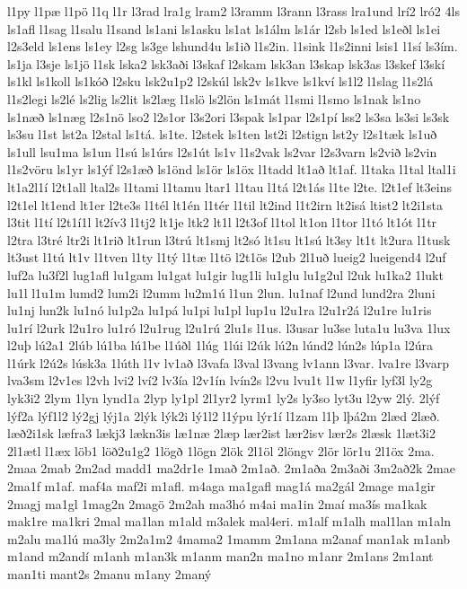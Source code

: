 {l1py
l1pæ
l1pö
l1q
l1r
l3rad
lra1g
lram2
l3ramm
l3rann
l3rass
lra1und
lrí2
lró2
4ls
ls1afl
l1sag
l1salu
l1sand
ls1ani
ls1asku
ls1at
ls1álm
ls1ár
l2sb
ls1ed
ls1eðl
ls1ei
l2s3eld
ls1ens
ls1ey
l2sg
ls3ge
lshund4u
ls1ið
l1s2in.
l1sink
l1s2inni
lsis1
l1sí
ls3ím.
ls1ja
l3sje
ls1jö
l1sk
lska2
lsk3aði
l3skaf
l2skam
lsk3an
l3skap
lsk3as
l3skef
l3skí
ls1kl
ls1koll
ls1kóð
l2sku
lsk2u1p2
l2skúl
lsk2v
ls1kve
ls1kví
ls1l2
l1slag
l1s2lá
l1s2legi
ls2lé
ls2lig
ls2lit
ls2læg
l1slö
ls2lön
ls1mát
l1smi
l1smo
ls1nak
ls1no
ls1næð
ls1næg
l2s1nö
lso2
l2s1or
l3s2ori
l3spak
ls1par
l2s1pí
lss2
ls3sa
ls3si
ls3sk
ls3su
l1st
lst2a
l2stal
ls1tá.
ls1te.
l2stek
ls1ten
lst2i
l2stign
lst2y
l2s1tæk
ls1uð
ls1ull
lsu1ma
ls1un
l1sú
ls1úrs
l2s1út
ls1v
l1s2vak
ls2var
l2s3varn
ls2við
ls2vin
l1s2vöru
ls1yr
ls1ýf
l2s1æð
ls1önd
ls1ör
ls1öx
l1tadd
lt1að
lt1af.
l1taka
l1tal
ltal1i
lt1a2l1í
l2t1all
ltal2s
l1tami
l1tamu
ltar1
l1tau
l1tá
l2t1ás
l1te
l2te.
l2t1ef
lt3eins
l2t1el
lt1end
lt1er
l2te3s
l1tél
lt1én
l1tér
l1til
lt2ind
l1t2irn
lt2isá
ltist2
lt2i1sta
l3tit
l1tí
l2t1í1l
lt2ív3
l1tj2
lt1je
ltk2
lt1l
l2t3of
l1tol
lt1on
l1tor
l1tó
lt1ót
l1tr
l2tra
l3tré
ltr2i
lt1rið
lt1run
l3trú
lt1smj
lt2só
lt1su
lt1sú
lt3sy
lt1t
lt2ura
l1tusk
lt3ust
l1tú
lt1v
l1tven
l1ty
l1tý
l1tæ
l1tö
l2t1ös
l2ub
2l1uð
lueig2
lueigend4
l2uf
luf2a
lu3f2l
lug1afl
lu1gam
lu1gat
lu1gir
lug1li
lu1glu
lu1g2ul
l2uk
lu1ka2
1lukt
lu1l
l1u1m
lumd2
lum2i
l2umm
lu2m1ú
l1un
2lun.
lu1naf
l2und
lund2ra
2luni
lu1nj
lun2k
lu1nó
lu1p2a
lu1pá
lu1pi
lu1pl
lup1u
l2u1ra
l2u1r2á
l2u1re
lu1ris
lu1rí
l2urk
l2u1ro
lu1ró
l2u1rug
l2u1rú
2lu1s
l1us.
l3usar
lu3se
luta1u
lu3va
1lux
l2uþ
lú2a1
2lúb
lú1ba
lú1be
l1úðl
1lúg
1lúi
l2úk
lú2n
lúnd2
lún2s
lúp1a
l2úra
l1úrk
l2ú2s
lúsk3a
1lúth
l1v
lv1að
l3vafa
l3val
l3vang
lv1ann
l3var.
lva1re
l3varp
lva3sm
l2v1es
l2vh
lvi2
lví2
lv3ía
l2v1ín
lvín2s
l2vu
lvu1t
l1w
l1yfir
lyf3l
ly2g
lyk3i2
2lym
1lyn
lynd1a
2lyp
ly1pl
2l1yr2
lyrm1
ly2s
ly3so
lyt3u
l2yw
2lý.
2lýf
lýf2a
lýf1l2
lý2gj
lýj1a
2lýk
lýk2i
lý1l2
l1ýpu
lýr1í
l1zam
l1þ
lþá2m
2læd
2læð.
læð2i1sk
læfra3
lækj3
lækn3is
læ1næ
2læp
lær2ist
lær2isv
lær2s
2læsk
1læt3i2
2l1ætl
l1æx
löb1
löð2u1g2
1lögð
1lögn
2lök
2l1öl
2löngv
2lör
lör1u
2l1öx
2ma.
2maa
2mab
2m2ad
madd1
ma2dr1e
1mað
2m1að.
2m1aða
2m3aði
3m2að2k
2mae
2ma1f
m1af.
maf4a
maf2i
m1afl.
m4aga
ma1gafl
mag1á
ma2gál
2mage
ma1gir
2magj
ma1gl
1mag2n
2magö
2m2ah
ma3hó
m4ai
ma1in
2maí
ma3ís
ma1kak
mak1re
ma1kri
2mal
ma1lan
m1ald
m3alek
mal4eri.
m1alf
m1alh
mal1lan
m1aln
m2alu
ma1lú
ma3ly
2m2a1m2
4mama2
1mamm
2m1ana
m2anaf
man1ak
m1anb
m1and
m2andí
m1anh
m1an3k
m1anm
man2n
ma1no
m1anr
2m1ans
2m1ant
man1ti
mant2s
2manu
m1any
2maný
}
